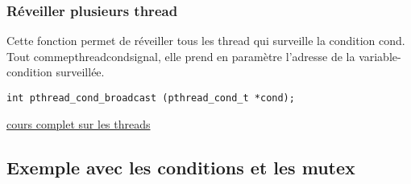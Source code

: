 \documentclass[a4paper]{article}
\begin{document}
\subsubsection{Réveiller plusieurs thread}
Cette fonction permet de réveiller tous les thread qui surveille la condition cond. Tout comme\newline pthread\textunderscore{}cond\textunderscore{}signal, elle prend en paramètre l'adresse de la variable-condition surveillée. 
\begin{lstlisting}
int pthread_cond_broadcast (pthread_cond_t *cond);
\end{lstlisting}
\href{http://franckh.developpez.com/tutoriels/posix/pthreads/}{cours complet sur les threads}
\newpage
\subsection{Exemple avec les conditions et les mutex}
\end{document}
